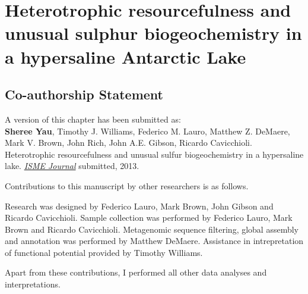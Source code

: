 \chapter{Heterotrophic resourcefulness and unusual sulphur biogeochemistry in a hypersaline Antarctic Lake}
\label{ch:org}
\acresetall

\section*{Co-authorship Statement}
A version of this chapter has been submitted as:\\

\textbf{Sheree Yau}, Timothy J. Williams, Federico M. Lauro,  Matthew Z. DeMaere, Mark V. Brown, John Rich, 
John A.E. Gibson, Ricardo Cavicchioli. 
Heterotrophic resourcefulness and unusual sulfur biogeochemistry in a hypersaline lake.
\emph{\underline{ISME Journal}}
submitted, 2013.

Contributions to this manuscript by other researchers is as follows.

Research was designed by Federico Lauro, Mark Brown, John Gibson and Ricardo Cavicchioli.
Sample collection was performed by Federico Lauro, Mark Brown and Ricardo Cavicchioli.
Metagenomic sequence filtering, global assembly and annotation was performed by Matthew DeMaere.
Assistance in intrepretation of functional potential provided by Timothy Williams.

Apart from these contributions, I performed all other data analyses and interpretations.
\newpage


